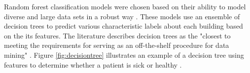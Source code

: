 Random forest classification models were chosen based on their ability to model diverse and large data sets in a robust way \cite{Breiman}. These models use an ensemble of decision trees to predict various characteristic labels about each building based on the its features. The literature describes decision trees as the "closest to meeting the requirements for serving as an off-the-shelf procedure for data mining" \cite{hastie_elements_2009}. Figure \ref{fig:decisiontree} illustrates an example of a decision tree using features to determine whether a patient is sick or healthy \cite{Geurts_2009}. 
